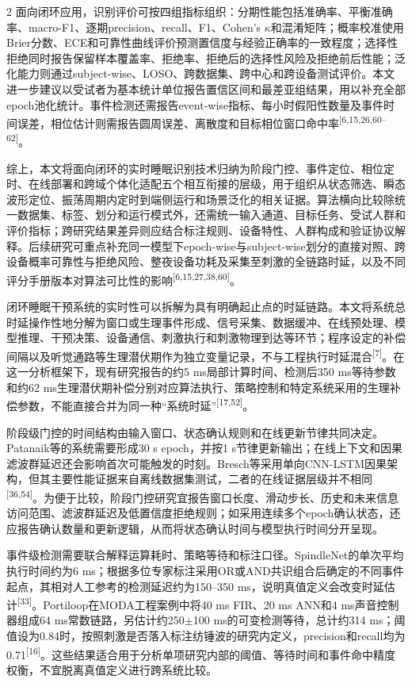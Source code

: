 \documentclass[UTF8,zihao=5,fontset=none]{ctexart}
\newcommand{\hei}{\CJKfamily{hei}}
\newcommand{\leveltwo}[1]{%
  \par\noindent{\hei\fontsize{10.5pt}{15.6pt}\selectfont\bfseries #1\par}}
\newcommand{\refcite}[1]{\nolinebreak[4]\textsuperscript{[#1]}}
\begin{document}
\begin{multicols}{2}
面向闭环应用，识别评价可按四组指标组织：分期性能包括准确率、平衡准确率、macro-F1、逐期precision、recall、F1、Cohen's $\kappa$和混淆矩阵；概率校准使用Brier分数、ECE和可靠性曲线评价预测置信度与经验正确率的一致程度；选择性拒绝同时报告保留样本覆盖率、拒绝率、拒绝后的选择性风险及拒绝前后性能；泛化能力则通过subject-wise、LOSO、跨数据集、跨中心和跨设备测试评价。本文进一步建议以受试者为基本统计单位报告置信区间和最差亚组结果，用以补充全部epoch池化统计。事件检测还需报告event-wise指标、每小时假阳性数量及事件时间误差，相位估计则需报告圆周误差、离散度和目标相位窗口命中率\refcite{6,15,26,60--62}。\par

综上，本文将面向闭环的实时睡眠识别技术归纳为阶段门控、事件定位、相位定时、在线部署和跨域个体化适配五个相互衔接的层级，用于组织从状态筛选、瞬态波形定位、振荡周期内定时到端侧运行和场景泛化的相关证据。算法横向比较除统一数据集、标签、划分和运行模式外，还需统一输入通道、目标任务、受试人群和评价指标；跨研究结果差异则应结合标注规则、设备特性、人群构成和验证协议解释。后续研究可重点补充同一模型下epoch-wise与subject-wise划分的直接对照、跨设备概率可靠性与拒绝风险、整夜设备功耗及采集至刺激的全链路时延，以及不同评分手册版本对算法可比性的影响\refcite{6,15,27,38,60}。\par

\leveltwo{2.3 闭环时延链路、同步机制与机会级评价}

闭环睡眠干预系统的实时性可以拆解为具有明确起止点的时延链路。本文将系统总时延操作性地分解为窗口或生理事件形成、信号采集、数据缓冲、在线预处理、模型推理、干预决策、设备通信、刺激执行和刺激物理到达等环节；程序设定的补偿间隔以及听觉通路等生理潜伏期作为独立变量记录，不与工程执行时延混合\refcite{7}。在这一分析框架下，现有研究报告的约5 ms局部计算时间、检测后350 ms等待参数和约62 ms生理潜伏期补偿分别对应算法执行、策略控制和特定系统采用的生理补偿参数，不能直接合并为同一种“系统时延”\refcite{17,52}。\par

阶段级门控的时间结构由输入窗口、状态确认规则和在线更新节律共同决定。Patanaik等的系统需要形成30 s epoch，并按1 s节律更新输出；在线上下文和因果滤波群延迟还会影响首次可能触发的时刻。Bresch等采用单向CNN-LSTM因果架构，但其主要性能证据来自离线数据集测试，二者的在线证据层级并不相同\refcite{36,54}。为便于比较，阶段门控研究宜报告窗口长度、滑动步长、历史和未来信息访问范围、滤波群延迟及低置信度拒绝规则；如采用连续多个epoch确认状态，还应报告确认数量和更新逻辑，从而将状态确认时间与模型执行时间分开呈现。\par

事件级检测需要联合解释运算耗时、策略等待和标注口径。SpindleNet的单次平均执行时间约为6 ms；根据多位专家标注采用OR或AND共识组合后确定的不同事件起点，其相对人工参考的检测延迟约为150--350 ms，说明真值定义会改变时延估计\refcite{33}。Portiloop在MODA工程案例中将40 ms FIR、20 ms ANN和4 ms声音控制器组成64 ms常数链路，另估计约250$\pm$100 ms的可变检测等待，总计约314 ms；阈值设为0.84时，按照刺激是否落入标注纺锤波的研究内定义，precision和recall均为0.71\refcite{16}。这些结果适合用于分析单项研究内部的阈值、等待时间和事件命中精度权衡，不宜脱离真值定义进行跨系统比较。\par


\end{multicols}
\end{document}
